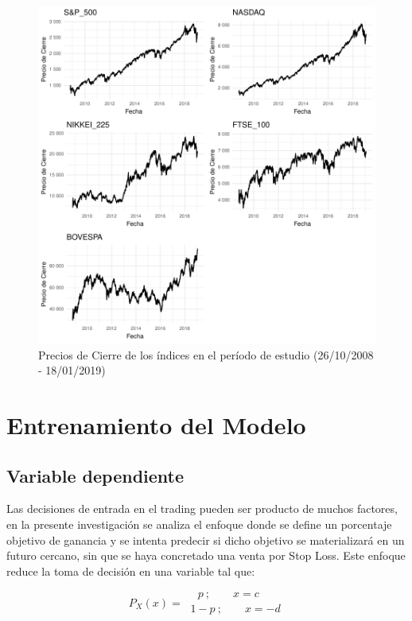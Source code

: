 \documentclass[a4paper,12pt]{Latex/Classes/PhDthesisPSnPDF}
\begin{document}
\begin{figure}[H]
\centering
\includegraphics{main-002}
\caption{Precios de Cierre de los índices en el período de estudio (26/10/2008 - 18/01/2019)}
\end{figure}

\section{Entrenamiento del Modelo}

\subsection{Variable dependiente}

Las decisiones de entrada en el trading pueden ser producto de muchos factores, en la presente investigación se analiza el enfoque donde se define un porcentaje objetivo de ganancia y se intenta predecir si dicho objetivo se materializará en un futuro cercano, sin que se haya concretado una venta por Stop Loss. Este enfoque reduce la toma de decisión en una variable tal que:

$$
P_{X}(x) = 
\begin{array}{ll} 
\ \ \ \ p \ ; \qquad x = c
\\
\ 1-p \ ; \qquad x = -d
\end{array}
$$
\end{document}
